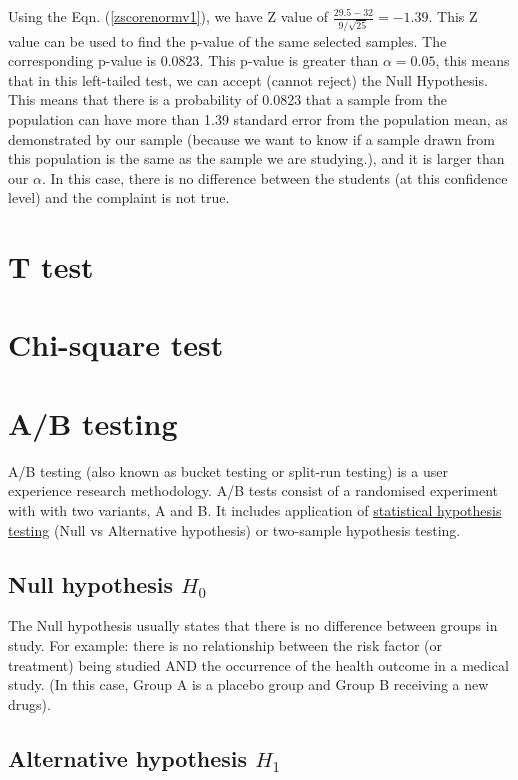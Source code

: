 Using the Eqn. (\ref{zscorenormv1}), we have Z value of $\frac{29.5-32}{9/\sqrt{25}} = -1.39$. This Z value can be used to find the p-value of the same selected samples. The corresponding p-value is 0.0823. This p-value is greater than $\alpha=0.05$, this means that in this left-tailed test, we can accept (cannot reject) the Null Hypothesis. This means that there is a probability of 0.0823 that a sample from the population can have more than 1.39 standard error from the population mean, as demonstrated by our sample (because we want to know if a sample drawn from this population is the same as the sample we are studying.), and it is larger than our $\alpha$. In this case, there is no difference between the students (at this confidence level) and the complaint is not true.

\section{T test}

\section{Chi-square test}

\section{A/B testing}
\label{abtest}

A/B testing (also known as bucket testing or split-run testing) is a user experience research methodology. A/B tests consist of a randomised experiment with with two variants, A and B. It includes application of \underline{statistical hypothesis testing} (Null vs Alternative hypothesis) or two-sample hypothesis testing. \\


\subsection{Null hypothesis $H_0$}

The Null hypothesis usually states that there is no difference between groups in study. For example: there is no relationship between the risk factor (or treatment) being studied AND the occurrence of the health outcome in a medical study. (In this case, Group A is a placebo group and Group B receiving a new drugs).

\subsection{Alternative hypothesis $H_1$}

